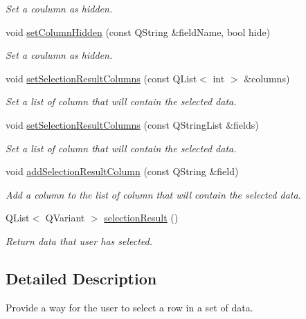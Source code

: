 \begin{DoxyCompactItemize}
\begin{DoxyCompactList}\small\item\em Set a coulumn as hidden. \end{DoxyCompactList}\item 
void \hyperlink{classmdt_sql_selection_dialog_a163280676920829583a4888b742fc96c}{setColumnHidden} (const QString \&fieldName, bool hide)
\begin{DoxyCompactList}\small\item\em Set a coulumn as hidden. \end{DoxyCompactList}\item 
void \hyperlink{classmdt_sql_selection_dialog_a88311778de191bf78e351ea4370b9a6d}{setSelectionResultColumns} (const QList$<$ int $>$ \&columns)
\begin{DoxyCompactList}\small\item\em Set a list of column that will contain the selected data. \end{DoxyCompactList}\item 
void \hyperlink{classmdt_sql_selection_dialog_a5c5c36414bf3c432979f53ad27f985cb}{setSelectionResultColumns} (const QStringList \&fields)
\begin{DoxyCompactList}\small\item\em Set a list of column that will contain the selected data. \end{DoxyCompactList}\item 
void \hyperlink{classmdt_sql_selection_dialog_ae5582bd717078a137dd71d5a1b9cc9f9}{addSelectionResultColumn} (const QString \&field)
\begin{DoxyCompactList}\small\item\em Add a column to the list of column that will contain the selected data. \end{DoxyCompactList}\item 
QList$<$ QVariant $>$ \hyperlink{classmdt_sql_selection_dialog_a23592c799f3b8945b3f5e72082dc265b}{selectionResult} ()
\begin{DoxyCompactList}\small\item\em Return data that user has selected. \end{DoxyCompactList}\end{DoxyCompactItemize}


\subsection{Detailed Description}
Provide a way for the user to select a row in a set of data. 

